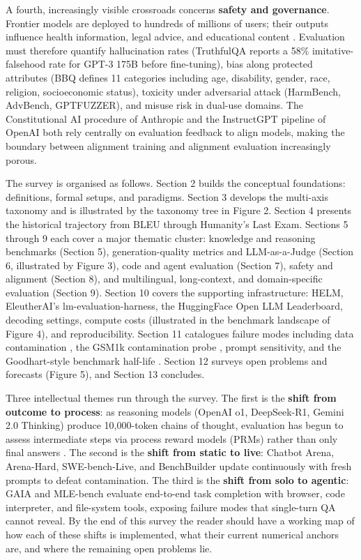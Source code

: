 \documentclass{article}
\begin{document}
A fourth, increasingly visible crossroads concerns \textbf{safety and governance}. Frontier models are deployed to hundreds of millions of users; their outputs influence health information, legal advice, and educational content \cite{singhal20232023,singhal20252025}. Evaluation must therefore quantify hallucination rates (TruthfulQA reports a 58\% imitative-falsehood rate for GPT-3 175B before fine-tuning), bias along protected attributes (BBQ defines 11 categories including age, disability, gender, race, religion, socioeconomic status), toxicity under adversarial attack (HarmBench, AdvBench, GPTFUZZER), and misuse risk in dual-use domains. The Constitutional AI procedure of Anthropic \cite{bai20222022} and the InstructGPT pipeline of OpenAI \cite{ouyang20222022} both rely centrally on evaluation feedback to align models, making the boundary between alignment training and alignment evaluation increasingly porous.

The survey is organised as follows. Section 2 builds the conceptual foundations: definitions, formal setups, and paradigms. Section 3 develops the multi-axis taxonomy and is illustrated by the taxonomy tree in Figure 2. Section 4 presents the historical trajectory from BLEU through Humanity's Last Exam. Sections 5 through 9 each cover a major thematic cluster: knowledge and reasoning benchmarks (Section 5), generation-quality metrics and LLM-as-a-Judge (Section 6, illustrated by Figure 3), code and agent evaluation (Section 7), safety and alignment (Section 8), and multilingual, long-context, and domain-specific evaluation (Section 9). Section 10 covers the supporting infrastructure: HELM, EleutherAI's lm-evaluation-harness, the HuggingFace Open LLM Leaderboard, decoding settings, compute costs (illustrated in the benchmark landscape of Figure 4), and reproducibility. Section 11 catalogues failure modes including data contamination \cite{sainz20242024}, the GSM1k contamination probe \cite{zhang20242024}, prompt sensitivity, and the Goodhart-style benchmark half-life \cite{white20242024}. Section 12 surveys open problems and forecasts (Figure 5), and Section 13 concludes.

Three intellectual themes run through the survey. The first is the \textbf{shift from outcome to process}: as reasoning models (OpenAI o1, DeepSeek-R1, Gemini 2.0 Thinking) produce 10,000-token chains of thought, evaluation has begun to assess intermediate steps via process reward models (PRMs) rather than only final answers \cite{xu20252025}. The second is the \textbf{shift from static to live}: Chatbot Arena, Arena-Hard, SWE-bench-Live, and BenchBuilder \cite{chiang20242024,li20242024} update continuously with fresh prompts to defeat contamination. The third is the \textbf{shift from solo to agentic}: GAIA \cite{mialon2024gaiaabenchmarkforg} and MLE-bench \cite{chan20242024} evaluate end-to-end task completion with browser, code interpreter, and file-system tools, exposing failure modes that single-turn QA cannot reveal. By the end of this survey the reader should have a working map of how each of these shifts is implemented, what their current numerical anchors are, and where the remaining open problems lie.
\end{document}
